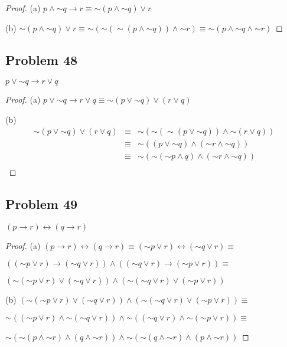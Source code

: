 \documentclass[14pt]{extarticle}
\newcommand{\bic}{\leftrightarrow}
\begin{document}
\begin{proof}
(a) $p \wedge {\sim q} \to r \equiv {\sim(p \wedge {\sim q})} \vee r$

(b) ${\sim(p \wedge {\sim q})} \vee r \equiv {\sim ({\sim ({\sim(p \wedge {\sim
q})})} \wedge {\sim r})} \equiv {\sim (p \wedge {\sim q} \wedge {\sim r})}$
\end{proof}

\subsection{Problem 48}
$p \vee {\sim q} \to r \vee q$

\begin{proof}
(a) $p \vee {\sim q} \to r \vee q \equiv {\sim (p \vee {\sim q})} \vee (r \vee
q)$

(b) 
$$
\begin{array}{rcl}
{\sim (p \vee {\sim q})} \vee (r \vee q) & \equiv & {\sim ({\sim ({\sim (p \vee
{\sim q})})} \wedge {\sim (r \vee q)})} \\
& \equiv &  {\sim((p \vee {\sim q}) \wedge ({\sim r} \wedge {\sim q}))} \\
& \equiv & {\sim({\sim ({\sim p} \wedge q)} \wedge ({\sim r} \wedge {\sim q}))}
\\
\end{array}
$$
\end{proof}

\subsection{Problem 49}
$(p \to r) \bic (q \to r)$

\begin{proof}
(a) $(p \to r) \bic (q \to r) \equiv ({\sim p} \vee r) \bic ({\sim q} \vee r)
\equiv$

$(({\sim p} \vee r) \to ({\sim q} \vee r)) \wedge (({\sim q} \vee r) \to ({\sim
p} \vee r)) \equiv$

$({\sim ({\sim p} \vee r)} \vee ({\sim q} \vee r)) \wedge ({\sim ({\sim q} \vee
r)} \vee ({\sim p} \vee r))$

(b) $({\sim ({\sim p} \vee r)} \vee ({\sim q} \vee r)) \wedge ({\sim ({\sim q}
\vee r)} \vee ({\sim p} \vee r)) \equiv$

${\sim (({\sim p} \vee r) \wedge {\sim ({\sim q} \vee r)})} \wedge {\sim (({\sim
q} \vee r) \wedge {\sim ({\sim p} \vee r)})} \equiv$

${\sim ({\sim (p \wedge {\sim r})} \wedge (q \wedge {\sim r}))} \wedge {\sim
({\sim (q \wedge {\sim r})} \wedge (p \wedge {\sim r}))}$
\end{proof}
\end{document}

